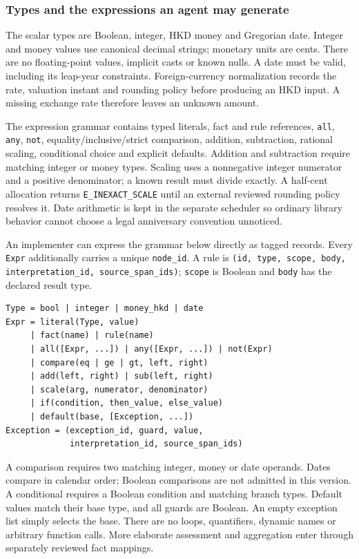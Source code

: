 \subsubsection{Types and the expressions an agent may generate}

The scalar types are Boolean, integer, HKD money and Gregorian date. Integer
and money values use canonical decimal strings; monetary units are cents.
There are no floating-point values, implicit casts or known nulls. A date must
be valid, including its leap-year constraints. Foreign-currency normalization
records the rate, valuation instant and rounding policy before producing an HKD
input. A missing exchange rate therefore leaves an unknown amount.

The expression grammar contains typed literals, fact and rule references,
\texttt{all}, \texttt{any}, \texttt{not}, equality/inclusive/strict comparison,
addition, subtraction, rational scaling, conditional choice and explicit defaults.
Addition and subtraction require matching integer or money types. Scaling uses
a nonnegative integer numerator and a positive denominator; a known result must
divide exactly. A half-cent allocation returns \texttt{E\_INEXACT\_SCALE} until
an external reviewed rounding policy resolves it. Date arithmetic is kept in
the separate scheduler so ordinary library behavior cannot choose a legal
anniversary convention unnoticed.

An implementer can express the grammar below directly as tagged records. Every
\texttt{Expr} additionally carries a unique \texttt{node\_id}. A rule is
\texttt{(id, type, scope, body, interpretation\_id, source\_span\_ids)};
\texttt{scope} is Boolean and \texttt{body} has the declared result type.
\begin{lstlisting}[caption={Complete operator grammar for RuleIR 0.1; repeated arguments are ordered. The Java demonstration implements a stated subset.}]
Type = bool | integer | money_hkd | date
Expr = literal(Type, value)
     | fact(name) | rule(name)
     | all([Expr, ...]) | any([Expr, ...]) | not(Expr)
     | compare(eq | ge | gt, left, right)
     | add(left, right) | sub(left, right)
     | scale(arg, numerator, denominator)
     | if(condition, then_value, else_value)
     | default(base, [Exception, ...])
Exception = (exception_id, guard, value,
             interpretation_id, source_span_ids)
\end{lstlisting}
A comparison requires two matching integer, money or date operands. Dates
compare in calendar order; Boolean comparisons are not admitted in this version.
A conditional requires a Boolean condition and matching branch types. Default
values match their base type, and all guards are Boolean. An empty exception
list simply selects the base. There are no loops, quantifiers, dynamic names or
arbitrary function calls. More elaborate assessment and aggregation enter
through separately reviewed fact mappings.

